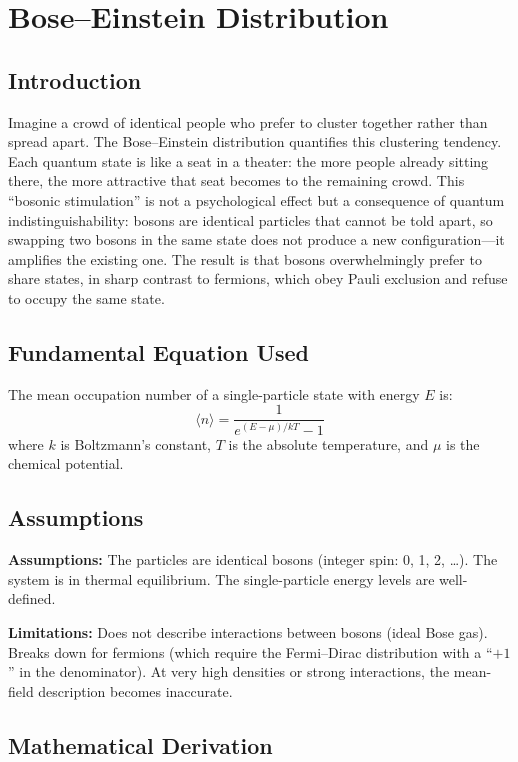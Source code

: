 \chapter{Bose--Einstein Distribution}

\section*{Introduction}

Imagine a crowd of identical people who prefer to cluster together rather than spread apart. The Bose--Einstein distribution quantifies this clustering tendency. Each quantum state is like a seat in a theater: the more people already sitting there, the more attractive that seat becomes to the remaining crowd. This ``bosonic stimulation'' is not a psychological effect but a consequence of quantum indistinguishability: bosons are identical particles that cannot be told apart, so swapping two bosons in the same state does not produce a new configuration---it amplifies the existing one. The result is that bosons overwhelmingly prefer to share states, in sharp contrast to fermions, which obey Pauli exclusion and refuse to occupy the same state.
\section*{Fundamental Equation Used}

The mean occupation number of a single-particle state with energy $E$ is:
\[
\langle n \rangle = \frac{1}{e^{(E - \mu)/kT} - 1}
\]
where $k$ is Boltzmann's constant, $T$ is the absolute temperature, and $\mu$ is the chemical potential.
\section*{Assumptions}

\textbf{Assumptions:} The particles are identical bosons (integer spin: 0, 1, 2, \ldots). The system is in thermal equilibrium. The single-particle energy levels are well-defined.


\textbf{Limitations:} Does not describe interactions between bosons (ideal Bose gas). Breaks down for fermions (which require the Fermi--Dirac distribution with a ``$+1$'' in the denominator). At very high densities or strong interactions, the mean-field description becomes inaccurate.


\section*{Mathematical Derivation}

